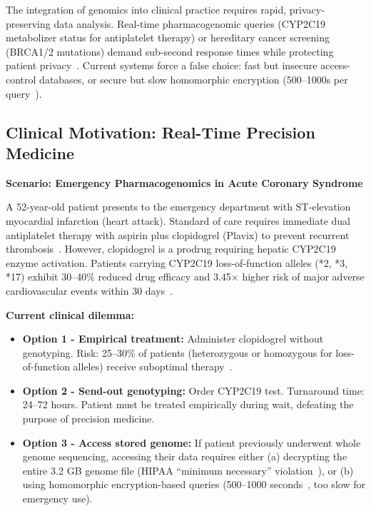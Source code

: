 \documentclass[12pt,a4paper]{article}
\begin{document}
The integration of genomics into clinical practice requires rapid, privacy-preserving data analysis. Real-time pharmacogenomic queries (CYP2C19 metabolizer status for antiplatelet therapy) or hereditary cancer screening (BRCA1/2 mutations) demand sub-second response times while protecting patient privacy~\cite{Relling2011}. Current systems force a false choice: fast but insecure access-control databases, or secure but slow homomorphic encryption (500--1000s per query~\cite{Ayday2013}).

\subsection{Clinical Motivation: Real-Time Precision Medicine}

\textbf{Scenario: Emergency Pharmacogenomics in Acute Coronary Syndrome}

A 52-year-old patient presents to the emergency department with ST-elevation myocardial infarction (heart attack). Standard of care requires immediate dual antiplatelet therapy with aspirin plus clopidogrel (Plavix) to prevent recurrent thrombosis~\cite{Levine2016}. However, clopidogrel is a prodrug requiring hepatic CYP2C19 enzyme activation. Patients carrying CYP2C19 loss-of-function alleles (*2, *3, *17) exhibit 30--40\% reduced drug efficacy and 3.45× higher risk of major adverse cardiovascular events within 30 days~\cite{Mega2009,Scott2013}.

\textbf{Current clinical dilemma:}
\begin{itemize}
\item \textbf{Option 1 - Empirical treatment:} Administer clopidogrel without genotyping. Risk: 25--30\% of patients (heterozygous or homozygous for loss-of-function alleles) receive suboptimal therapy~\cite{Scott2013}.
\item \textbf{Option 2 - Send-out genotyping:} Order CYP2C19 test. Turnaround time: 24--72 hours. Patient must be treated empirically during wait, defeating the purpose of precision medicine.
\item \textbf{Option 3 - Access stored genome:} If patient previously underwent whole genome sequencing, accessing their data requires either (a) decrypting the entire 3.2 GB genome file (HIPAA ``minimum necessary'' violation~\cite{HIPAA2013}), or (b) using homomorphic encryption-based queries (500--1000 seconds~\cite{Ayday2013}, too slow for emergency use).
\end{itemize}
\end{document}
